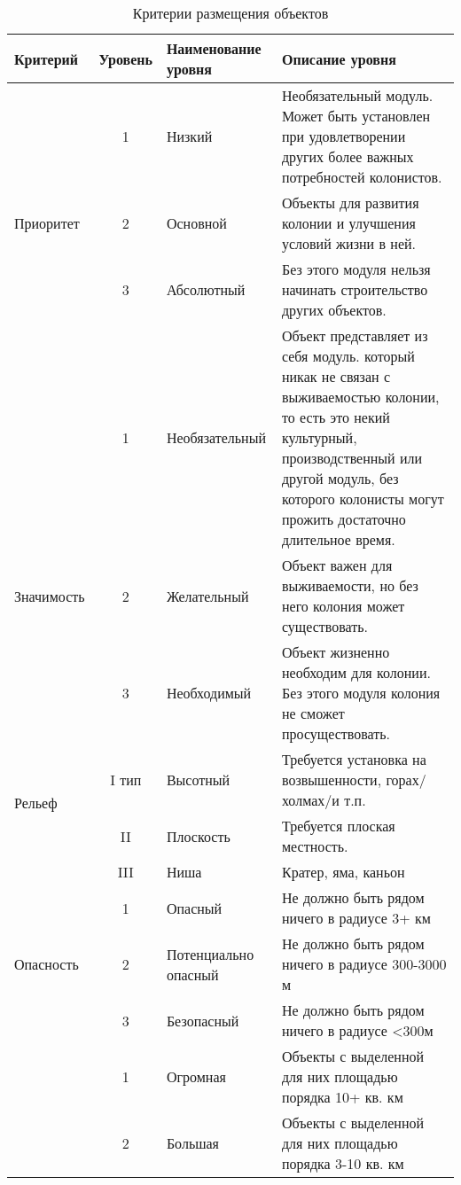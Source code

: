 
\newpage
\listoftables


%
\setlength{\extrarowheight}{.7mm}
\begin{table}[H]
	\footnotesize
	\centering
	\caption{Критерии размещения объектов}\label{tab:criterions}
	\begin{tabular}{|p{2.2cm}|c|p{2.5cm}|p{9cm}|}
		\hline
		Критерий & Уровень & Наименование уровня & Описание уровня \\ \hline
		& 1 & Низкий & Необязательный модуль. Может быть установлен при удовлетворении других более важных потребностей колонистов. \\ \cline{2-4}
		Приоритет & 2 & Основной & Объекты для развития колонии и улучшения условий жизни в ней. \\ \cline{2-4}
		& 3 & Абсолютный & Без этого модуля нельзя начинать строительство других объектов. \\ \hline
		& 1 & Необязательный & Объект представляет из себя модуль. который никак не связан с выживаемостью колонии, то есть это некий культурный, производственный или другой модуль, без которого колонисты могут прожить достаточно длительное время. \\ \cline{2-4}
		Значимость & 2 & Желательный & Объект важен для выживаемости, но без него колония может существовать. \\ \cline{2-4}
		& 3 & Необходимый & Объект жизненно необходим для колонии. Без этого модуля колония не сможет просуществовать. \\ \hline
		\multirow{2}{*}{Рельеф} & I тип & Высотный & Требуется установка на возвышенности, горах/холмах/и т.п. \\ \cline{2-4}
		местности & II & Плоскость & Требуется плоская местность. \\ \cline{2-4}
		& III & Ниша & Кратер, яма, каньон \\ \hline
		& 1 & Опасный & Не должно быть рядом ничего в радиусе 3+ км \\ \cline{2-4}
		Опасность & 2 & Потенциально опасный & Не должно быть рядом ничего в радиусе 300-3000 м \\ \cline{2-4}
		& 3 & Безопасный & Не должно быть рядом ничего в радиусе <300м \\ \hline
		& 1 & Огромная & Объекты с выделенной для них площадью порядка 10+ кв. км \\ \cline{2-4}
		& 2 & Большая & Объекты с выделенной для них площадью порядка 3-10 кв. км \\ \cline{2-4}

\end{tabular}
\end{table}
